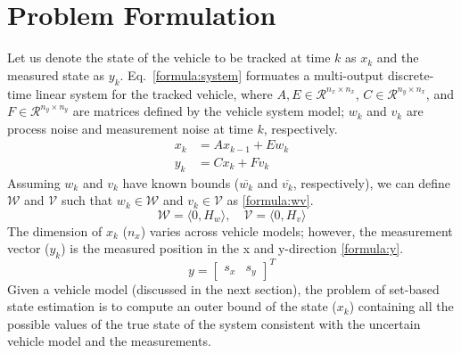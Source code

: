 \section{Problem Formulation}
Let us denote the state of the vehicle to be tracked at time $k$ as $x_k$ and the measured state as $y_k$. Eq.~\eqref{formula:system} formuates a multi-output discrete-time linear system for the tracked vehicle, where $A, E \in \mathcal{R} ^{n_x \times n_x}$, $C \in \mathcal{R} ^{n_y \times n_x}$, and $F \in \mathcal{R} ^{n_y \times n_y}$ are matrices defined by the vehicle system model; $w_k$ and $v_k$ are process noise and measurement noise at time $k$, respectively. 
\begin{equation}
\label{formula:system}
\begin{split}
x_{k} &= Ax_{k-1} + Ew_k\\
y_k &= Cx_k + Fv_k
\end{split}
\end{equation}
Assuming $w_k$ and $v_k$ have known bounds ($\overline{w_k}$ and $\overline{v_k}$, respectively), we can define $\mathcal{W}$ and $\mathcal{V}$ such that $w_k \in \mathcal{W}$ and $v_k \in \mathcal{V}$ as \eqref{formula:wv}.
\begin{equation}
\label{formula:wv}
\mathcal{W} = \langle 0, H_w \rangle ,\quad \mathcal{V} = \langle 0, H_v \rangle
\end{equation}
The dimension of $x_k$ ($n_x$) varies across vehicle models; however, the measurement vector ($y_k$) is the measured position in the x and y-direction \eqref{formula:y}.  
\begin{equation}
\label{formula:y}
y =[ 
\begin{matrix}
s_x & s_y
\end{matrix}
]^T
\end{equation}
Given a vehicle model (discussed in the next section), the problem of set-based state estimation is to compute an outer bound of the state ($x_k$) containing all the possible values of the true state of the system consistent with the uncertain vehicle model and the measurements.
